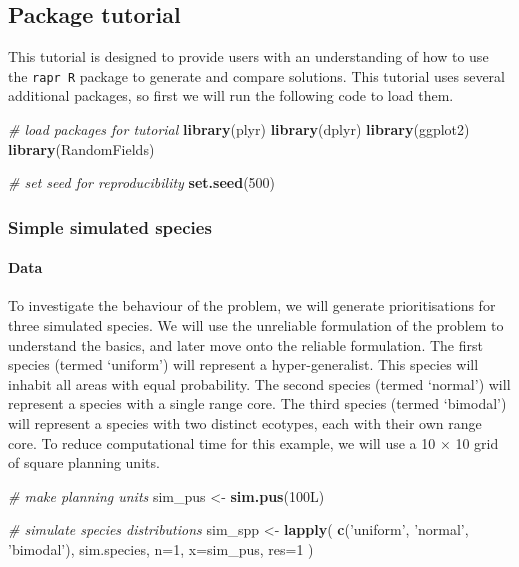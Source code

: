 \documentclass[11pt,]{article}
\newenvironment{Shaded}{\begin{snugshade}}{\end{snugshade}}
\newcommand{\KeywordTok}[1]{\textcolor[rgb]{0.13,0.29,0.53}{\textbf{{#1}}}}
\newcommand{\DataTypeTok}[1]{\textcolor[rgb]{0.13,0.29,0.53}{{#1}}}
\newcommand{\DecValTok}[1]{\textcolor[rgb]{0.00,0.00,0.81}{{#1}}}
\newcommand{\StringTok}[1]{\textcolor[rgb]{0.31,0.60,0.02}{{#1}}}
\newcommand{\CommentTok}[1]{\textcolor[rgb]{0.56,0.35,0.01}{\textit{{#1}}}}
\newcommand{\NormalTok}[1]{{#1}}
\begin{document}
\subsection{Package tutorial}\label{package-tutorial}

This tutorial is designed to provide users with an understanding of how
to use the \texttt{rapr R} package to generate and compare solutions.
This tutorial uses several additional packages, so first we will run the
following code to load them.

\begin{Shaded}
\begin{Highlighting}[]
\CommentTok{# load packages for tutorial}
\KeywordTok{library}\NormalTok{(plyr)}
\KeywordTok{library}\NormalTok{(dplyr)}
\KeywordTok{library}\NormalTok{(ggplot2)}
\KeywordTok{library}\NormalTok{(RandomFields)}

\CommentTok{# set seed for reproducibility}
\KeywordTok{set.seed}\NormalTok{(}\DecValTok{500}\NormalTok{)}
\end{Highlighting}
\end{Shaded}

\subsubsection{Simple simulated species}\label{simple-simulated-species}

\paragraph{Data}\label{data}

To investigate the behaviour of the problem, we will generate
prioritisations for three simulated species. We will use the unreliable
formulation of the problem to understand the basics, and later move onto
the reliable formulation. The first species (termed `uniform') will
represent a hyper-generalist. This species will inhabit all areas with
equal probability. The second species (termed `normal') will represent a
species with a single range core. The third species (termed `bimodal')
will represent a species with two distinct ecotypes, each with their own
range core. To reduce computational time for this example, we will use a
10 $\times$ 10 grid of square planning units.

\begin{Shaded}
\begin{Highlighting}[]
\CommentTok{# make planning units}
\NormalTok{sim_pus <-}\StringTok{ }\KeywordTok{sim.pus}\NormalTok{(100L)}

\CommentTok{# simulate species distributions}
\NormalTok{sim_spp <-}\StringTok{ }\KeywordTok{lapply}\NormalTok{(}
    \KeywordTok{c}\NormalTok{(}\StringTok{'uniform'}\NormalTok{, }\StringTok{'normal'}\NormalTok{, }\StringTok{'bimodal'}\NormalTok{),}
    \NormalTok{sim.species,}
  \DataTypeTok{n=}\DecValTok{1}\NormalTok{,}
  \DataTypeTok{x=}\NormalTok{sim_pus,}
  \DataTypeTok{res=}\DecValTok{1}
\NormalTok{)}
\end{Highlighting}
\end{Shaded}
\end{document}
